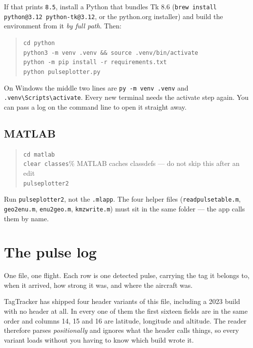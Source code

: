 \documentclass[11pt,a4paper]{article}
\newcommand{\code}[1]{\texttt{\small #1}}
\begin{document}
\noindent If that prints \code{8.5}, install a Python that bundles Tk 8.6
(\code{brew install python@3.12 python-tk@3.12}, or the python.org installer)
and build the environment from it \emph{by full path}. Then:

\begin{quote}
\code{cd python}\\
\code{python3 -m venv .venv \&\& source .venv/bin/activate}\\
\code{python -m pip install -r requirements.txt}\\
\code{python pulseplotter.py}
\end{quote}

\noindent On Windows the middle two lines are \code{py -m venv .venv} and
\code{.venv\textbackslash Scripts\textbackslash activate}. Every new terminal
needs the activate step again. You can pass a log on the command line to open it
straight away.

\subsection{MATLAB}

\begin{quote}
\code{cd matlab}\\
\code{clear classes}\qquad\% MATLAB caches classdefs --- do not skip this after an edit\\
\code{pulseplotter2}
\end{quote}

\noindent Run \code{pulseplotter2}, not the \code{.mlapp}. The four helper files
(\code{readpulsetable.m}, \code{geo2enu.m}, \code{enu2geo.m}, \code{kmzwrite.m})
must sit in the same folder --- the app calls them by name.

\section{The pulse log}

One file, one flight. Each row is one detected pulse, carrying the tag it
belongs to, when it arrived, how strong it was, and where the aircraft was.

\textsf{TagTracker} has shipped four header variants of this file, including a
2023 build with no header at all. In every one of them the first sixteen fields
are in the same order and columns 14, 15 and 16 are latitude, longitude and
altitude. The reader therefore parses \emph{positionally} and ignores what the
header calls things, so every variant loads without you having to know which
build wrote it.
\end{document}
